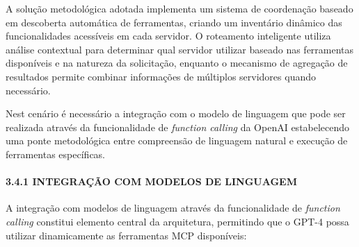 \documentclass[
]{article}
\begin{document}
A solução metodológica adotada implementa um sistema de coordenação
baseado em descoberta automática de ferramentas, criando um inventário
dinâmico das funcionalidades acessíveis em cada servidor. O roteamento
inteligente utiliza análise contextual para determinar qual servidor
utilizar baseado nas ferramentas disponíveis e na natureza da
solicitação, enquanto o mecanismo de agregação de resultados permite
combinar informações de múltiplos servidores quando necessário.

Nest cenário é necessário a integração com o modelo de linguagem que
pode ser realizada através da funcionalidade de \emph{function calling}
da OpenAI estabelecendo uma ponte metodológica entre compreensão de
linguagem natural e execução de ferramentas específicas.

\paragraph{3.4.1 INTEGRAÇÃO COM MODELOS DE
LINGUAGEM}\label{integrauxe7uxe3o-com-modelos-de-linguagem}

A integração com modelos de linguagem através da funcionalidade de
\emph{function calling} constitui elemento central da arquitetura,
permitindo que o GPT-4 possa utilizar dinamicamente as ferramentas MCP
disponíveis:
\end{document}
